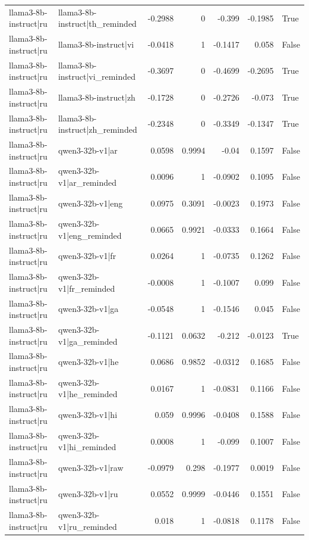 \begin{table}
\begin{tabular}{l l r r r r l}
llama3-8b-instruct|ru & llama3-8b-instruct|th_reminded & -0.2988 & 0 & -0.399 & -0.1985 & True \\
llama3-8b-instruct|ru & llama3-8b-instruct|vi & -0.0418 & 1 & -0.1417 & 0.058 & False \\
llama3-8b-instruct|ru & llama3-8b-instruct|vi_reminded & -0.3697 & 0 & -0.4699 & -0.2695 & True \\
llama3-8b-instruct|ru & llama3-8b-instruct|zh & -0.1728 & 0 & -0.2726 & -0.073 & True \\
llama3-8b-instruct|ru & llama3-8b-instruct|zh_reminded & -0.2348 & 0 & -0.3349 & -0.1347 & True \\
llama3-8b-instruct|ru & qwen3-32b-v1|ar & 0.0598 & 0.9994 & -0.04 & 0.1597 & False \\
llama3-8b-instruct|ru & qwen3-32b-v1|ar_reminded & 0.0096 & 1 & -0.0902 & 0.1095 & False \\
llama3-8b-instruct|ru & qwen3-32b-v1|eng & 0.0975 & 0.3091 & -0.0023 & 0.1973 & False \\
llama3-8b-instruct|ru & qwen3-32b-v1|eng_reminded & 0.0665 & 0.9921 & -0.0333 & 0.1664 & False \\
llama3-8b-instruct|ru & qwen3-32b-v1|fr & 0.0264 & 1 & -0.0735 & 0.1262 & False \\
llama3-8b-instruct|ru & qwen3-32b-v1|fr_reminded & -0.0008 & 1 & -0.1007 & 0.099 & False \\
llama3-8b-instruct|ru & qwen3-32b-v1|ga & -0.0548 & 1 & -0.1546 & 0.045 & False \\
llama3-8b-instruct|ru & qwen3-32b-v1|ga_reminded & -0.1121 & 0.0632 & -0.212 & -0.0123 & True \\
llama3-8b-instruct|ru & qwen3-32b-v1|he & 0.0686 & 0.9852 & -0.0312 & 0.1685 & False \\
llama3-8b-instruct|ru & qwen3-32b-v1|he_reminded & 0.0167 & 1 & -0.0831 & 0.1166 & False \\
llama3-8b-instruct|ru & qwen3-32b-v1|hi & 0.059 & 0.9996 & -0.0408 & 0.1588 & False \\
llama3-8b-instruct|ru & qwen3-32b-v1|hi_reminded & 0.0008 & 1 & -0.099 & 0.1007 & False \\
llama3-8b-instruct|ru & qwen3-32b-v1|raw & -0.0979 & 0.298 & -0.1977 & 0.0019 & False \\
llama3-8b-instruct|ru & qwen3-32b-v1|ru & 0.0552 & 0.9999 & -0.0446 & 0.1551 & False \\
llama3-8b-instruct|ru & qwen3-32b-v1|ru_reminded & 0.018 & 1 & -0.0818 & 0.1178 & False \\

\end{tabular}
\end{table}
